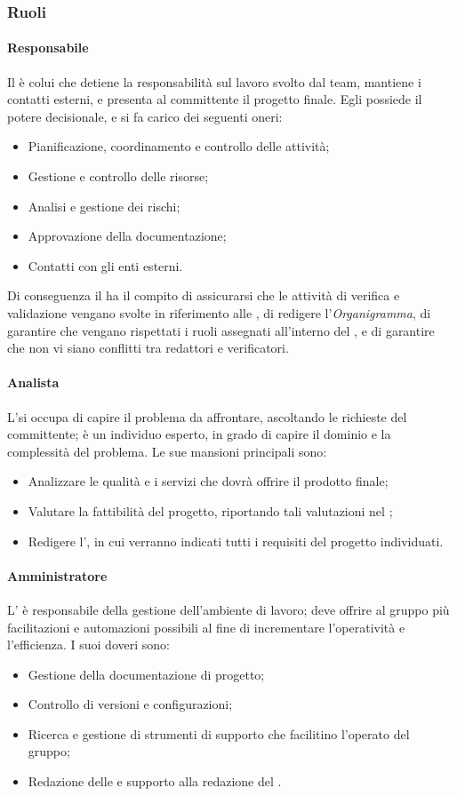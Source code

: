 \subsubsection{Ruoli}
\paragraph{Responsabile}
Il \RdP{} è colui che detiene la responsabilità sul lavoro svolto dal team, mantiene i contatti esterni, e presenta al committente il progetto finale. Egli possiede il potere decisionale, e si fa carico dei seguenti oneri:
\begin{itemize}
	\item Pianificazione, coordinamento e controllo delle attività;
	\item Gestione e controllo delle risorse;
	\item Analisi e gestione dei rischi;
	\item Approvazione della documentazione;
	\item Contatti con gli enti esterni.
\end{itemize}
Di conseguenza il \RdP{} ha il compito di assicurarsi che le attività di verifica e validazione vengano svolte in riferimento alle \NdP{}, di redigere l'\emph{{{Organigramma}}}, di garantire che vengano rispettati i ruoli assegnati all'interno del \PdP, e di garantire che non vi siano conflitti tra redattori e verificatori. 

\paragraph{Analista}
L'\ana si occupa di capire il problema da affrontare, ascoltando le richieste del committente; è un individuo esperto, in grado di capire il dominio e la complessità del problema. Le sue mansioni principali sono:
\begin{itemize}
	\item Analizzare le qualità e i servizi che dovrà offrire il prodotto finale;
	\item Valutare la fattibilità del progetto, riportando tali valutazioni nel \SdF{};
	\item Redigere l'\AdR{}, in cui verranno indicati tutti i requisiti del progetto individuati.
\end{itemize}

\paragraph{Amministratore}
L'\adm{} è responsabile della gestione dell'ambiente di lavoro; deve offrire al gruppo più facilitazioni e automazioni possibili al fine di incrementare l'operatività e l'efficienza. I suoi doveri sono:
\begin{itemize}
\item Gestione della documentazione di progetto;
\item Controllo di versioni e configurazioni;
\item Ricerca e gestione di strumenti di supporto che facilitino l'operato del gruppo;
\item Redazione delle \NdP{} e supporto alla redazione del \PdP{}.
\end{itemize}

